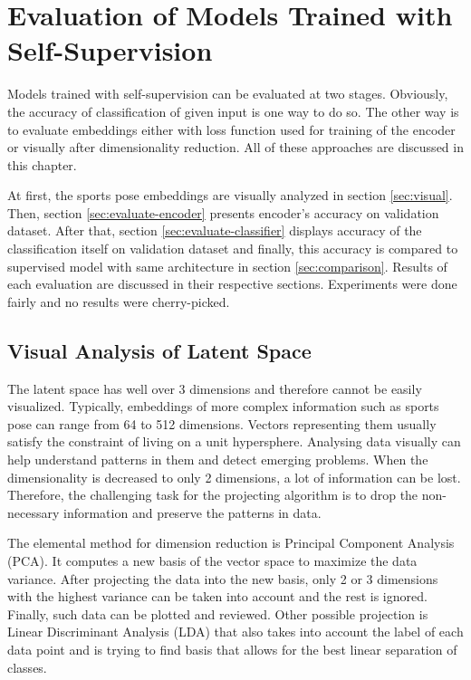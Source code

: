 \chapter{\label{chap:evaluation}Evaluation of Models Trained with Self-Supervision}

Models trained with self-supervision can be evaluated at two stages. Obviously, the accuracy of classification of given input is one way to do so. The other way is to evaluate embeddings either with loss function used for training of the encoder or visually after dimensionality reduction. All of these approaches are discussed in this chapter.

At first, the sports pose embeddings are visually analyzed in section \ref{sec:visual}. Then, section \ref{sec:evaluate-encoder} presents encoder's accuracy on validation dataset. After that, section \ref{sec:evaluate-classifier} displays accuracy of the classification itself on validation dataset and finally, this accuracy is compared to supervised model with same architecture in section \ref{sec:comparison}. Results of each evaluation are discussed in their respective sections. Experiments were done fairly and no results were cherry-picked.

\section{\label{sec:visual}Visual Analysis of Latent Space}

The latent space has well over 3 dimensions and therefore cannot be easily visualized. Typically, embeddings of more complex information such as sports pose can range from 64 to 512 dimensions. Vectors representing them usually satisfy the constraint of living on a unit hypersphere. Analysing data visually can help understand patterns in them and detect emerging problems. When the dimensionality is decreased to only 2 dimensions, a lot of information can be lost. Therefore, the challenging task for the projecting algorithm is to drop the non-necessary information and preserve the patterns in data.

The elemental method for dimension reduction is Principal Component Analysis (PCA). It computes a new basis of the vector space to maximize the data variance. After projecting the data into the new basis, only 2 or 3 dimensions with the highest variance can be taken into account and the rest is ignored. Finally, such data can be plotted and reviewed. Other possible projection is Linear Discriminant Analysis (LDA) that also takes into account the label of each data point and is trying to find basis that allows for the best linear separation of classes.

